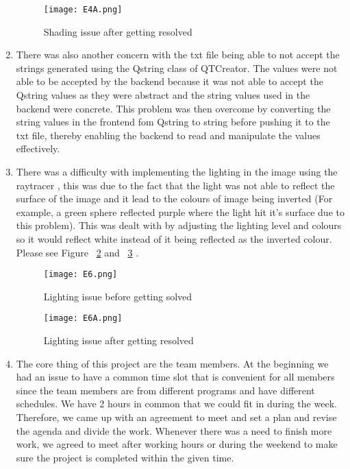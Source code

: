 \documentclass{article}
\begin{document}
\begin{enumerate}
\begin{figure}[h]
\centering
\texttt{[image: E4A.png]}
\caption{Shading issue after getting resolved \label{point4b}}
\end{figure}

\item 	There was also another concern with the txt file being able to not accept the strings generated using the Qstring class of QTCreator. The values were not able to be accepted by the backend because it was not able to accept the Qstring values as they were abstract and the string values used in the backend were concrete. This problem was then overcome by converting the string values in the frontend fom Qstring to string before pushing it to the txt file, thereby enabling the backend to read and manipulate the values effectively.
\item 	There was a difficulty with implementing the lighting in the image using the raytracer , this was due to the fact that the light was not able to reflect the surface of the image and it lead to the colours of image being inverted (For example, a green sphere reflected purple where the light hit it’s surface due to this problem). This was dealt with by adjusting the lighting level and colours so it would reflect white instead of it being reflected as the inverted colour. Please see Figure ~\ref{point6a} and ~\ref{point6b} . 
\begin{figure}[!H]
\centering
\texttt{[image: E6.png]}
\caption{Lighting issue before getting solved \label{point6a}}
\end{figure}

\begin{figure}[!H]
\centering
\texttt{[image: E6A.png]}
\caption{Lighting issue after getting resolved \label{point6b}}
\end{figure}

\item The core thing of this project are the team members. At the beginning we had an issue to have a common time slot that is convenient for all members since the team members are from different programs and have different schedules. We have 2 hours in common that we could fit in during the week. Therefore, we came up with an agreement to meet and set a plan and revise the agenda and divide the work. Whenever there was a need to finish more work, we agreed to meet after working hours or during the weekend to make sure the project is completed within the given time.  


\end{enumerate}
\end{document}
